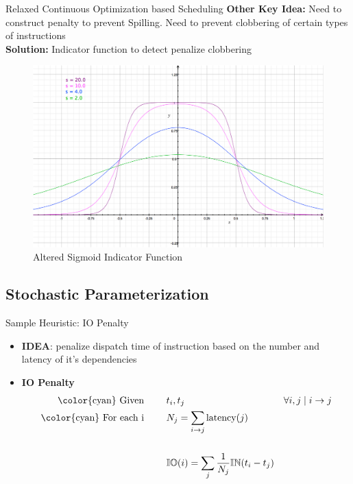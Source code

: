 \documentclass{beamer}
\begin{document}
\begin{darkframes}
\begin{frame}{Relaxed Continuous Optimization based Scheduling}
      {\bf \color{green} Other Key Idea:} Need to construct penalty to prevent \alert{Spilling}. Need to prevent clobbering of certain types of instructions \\
      {\bf \color{green} Solution:} Indicator function to detect penalize clobbering
      \begin{figure}
        \includegraphics[scale=0.2]{figures/sigmoid}
        \caption{Altered Sigmoid Indicator Function}
      \end{figure}
    \end{frame}

    \subsection{Stochastic Parameterization}
    \begin{frame}{Sample Heuristic: IO Penalty}

      \begin{itemize}
        \item {\bf \color{green} IDEA}: penalize dispatch time of instruction
          based on the number and latency of it's dependencies

        \item {\bf \color{green} IO Penalty} \\

          \begin{align*}
            \text{\color{cyan} Given \qquad}  & t_i,t_j \qquad & \forall i,j \mid i \rightarrow j  \\
            \text{\color{cyan} For each i \qquad} & N_j  =  \sum_{i \rightarrow j} \text{latency}(j) & \\
            \qquad & \qquad & \qquad \\
            \qquad & \mathbb{IO}(i) = \sum_{j} \frac{1}{N_j} \mathbb{IN}(t_i - t_j) & \qquad 
          \end{align*}
          

\end{itemize}
\end{frame}
\end{darkframes}
\end{document}
